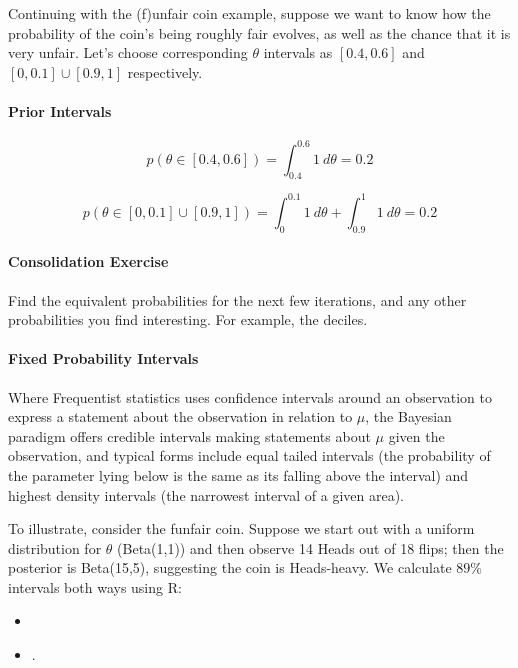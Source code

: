 \documentclass{article}
\begin{document}
Continuing with the (f)unfair coin example, suppose we want to know how the probability of the coin's being roughly fair evolves, as well as the chance that it is very unfair. Let's choose corresponding $\theta$ intervals as $[0.4,0.6]$ and $[0,0.1]\cup[0.9,1]$ respectively.

\paragraph{Prior Intervals}
\begin{equation}
    p(\theta \in[0.4,0.6])=\int_{0.4}^{0.6} 1 \ d \theta = 0.2
\end{equation}

\begin{equation}
    p(\theta \in[0,0.1]\cup[0.9,1])=\int_{0}^{0.1} 1 \ d \theta +\int_{0.9}^{1} 1 \ d \theta = 0.2
\end{equation}

\begin{Exercise}
    \paragraph{Consolidation Exercise}
    Find the equivalent probabilities for the next few iterations, and any other probabilities you find interesting. For example, the deciles.
\end{Exercise}

\paragraph{Fixed Probability Intervals}
Where Frequentist statistics uses confidence intervals around an observation to express a statement about the observation in relation to $\mu$, the Bayesian paradigm offers credible intervals making statements about $\mu$ given the observation, and typical forms include equal tailed intervals (the probability of the parameter lying below is the same as its falling above the interval) and highest density intervals (the narrowest interval of a given area).

To illustrate, consider the funfair coin. Suppose we start out with a uniform distribution for $\theta$ (Beta(1,1)) and then observe 14 Heads out of 18 flips; then the posterior is Beta(15,5), suggesting the coin is Heads-heavy. We calculate $89\%$ intervals both ways using R:

\begin{itemize}

\item {} 
\item {} 
.
\end{itemize}
\end{document}
